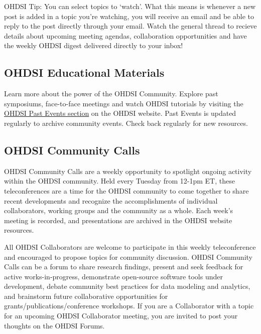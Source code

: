 \documentclass[11pt]{book}
\theoremstyle{definition}
\theoremstyle{definition}
\theoremstyle{definition}
\theoremstyle{remark}
\let\BeginKnitrBlock\begin \let\EndKnitrBlock\end
\begin{document}
\BeginKnitrBlock{rmdimportant}
OHDSI Tip: You can select topics to `watch'. What this means is whenever a new post is added in a topic you're watching, you will receive an email and be able to reply to the post directly through your email. Watch the general thread to recieve details about upcoming meeting agendas, collaboration opportunities and have the weekly OHDSI digest delivered directly to your inbox!
\EndKnitrBlock{rmdimportant}

\hypertarget{ohdsi-educational-materials}{%
\subsection{OHDSI Educational Materials}\label{ohdsi-educational-materials}}

Learn more about the power of the OHDSI Community. Explore past symposiums, face-to-face meetings and watch OHDSI tutorials by visiting the \href{https://www.ohdsi.org/past-events/}{OHDSI Past Events section} on the OHDSI website. Past Events is updated regularly to archive community events. Check back regularly for new resources.

\hypertarget{ohdsi-community-calls}{%
\subsection{OHDSI Community Calls}\label{ohdsi-community-calls}}

OHDSI Community Calls are a weekly opportunity to spotlight ongoing activity within the OHDSI community. Held every Tuesday from 12-1pm ET, these teleconferences are a time for the OHDSI community to come together to share recent developments and recognize the accomplishments of individual collaborators, working groups and the community as a whole. Each week's meeting is recorded, and presentations are archived in the OHDSI website resources.

All OHDSI Collaborators are welcome to participate in this weekly teleconference and encouraged to propose topics for community discussion. OHDSI Community Calls can be a forum to share research findings, present and seek feedback for active works-in-progress, demonstrate open-source software tools under development, debate community best practices for data modeling and analytics, and brainstorm future collaborative opportunities for grants/publications/conference workshops. If you are a Collaborator with a topic for an upcoming OHDSI Collaborator meeting, you are invited to post your thoughts on the OHDSI Forums.
\end{document}
